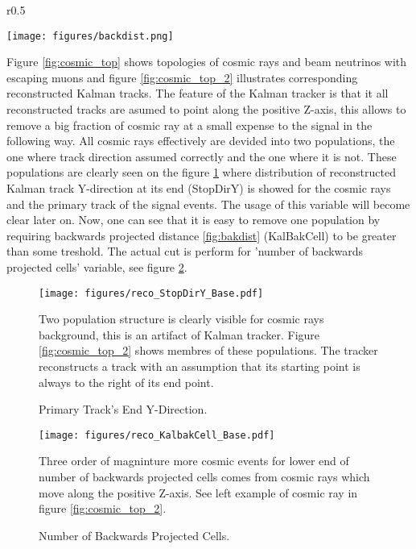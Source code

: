 \begin{wrapfigure}{r}{0.5\textwidth}
\vspace{-15pt}
  \begin{center}
    \texttt{[image: figures/backdist.png]}
  \end{center}
\vspace{0.5mm}
\caption{Backwards projected distance}
\label{fig:bakdist}
\end{wrapfigure}
Figure \ref{fig:cosmic_top} shows topologies of cosmic rays and beam neutrinos with escaping muons and figure
\ref{fig:cosmic_top_2} illustrates corresponding reconstructed Kalman tracks. The feature of the Kalman 
tracker is that it all reconstructed tracks are asumed to point along the positive Z-axis, this allows 
to remove a big fraction of cosmic ray at a small expense to the signal in the following way. All cosmic 
rays effectively are devided into two populations, the one where track direction assumed correctly and the 
one where it is not. These populations are clearly seen on the figure \ref{fig:stopdiry_1} where distribution
of reconstructed Kalman track Y-direction at its end (StopDirY) is showed for the cosmic rays and the primary 
track of the signal events. The usage of this variable will become clear later on. Now, one can see that it 
is easy to remove one population by requiring backwards projected distance \ref{fig:bakdist} (KalBakCell) to 
be greater than some treshold. The actual cut is perform for 'number of backwards projected cells' variable, 
see figure \ref{fig:kalbakcell}.
\begin{figure}[h]
\centering
\texttt{[image: figures/reco\_StopDirY\_Base.pdf]}
\caption{Primary Track's End Y-Direction.}
{Two population structure is clearly visible for cosmic rays background, this is an artifact of Kalman tracker.
Figure \ref{fig:cosmic_top_2} shows membres of these populations. The tracker reconstructs a track with an assumption 
that its starting point is always to the right of its end point. }
\label{fig:stopdiry_1}
\end{figure}
\begin{figure}[h]
\centering
\texttt{[image: figures/reco\_KalbakCell\_Base.pdf]}
\caption{Number of Backwards Projected Cells.}
{Three order of magninture more cosmic events for lower end of number of backwards projected cells comes from cosmic 
rays which move along the positive Z-axis. See left example of cosmic ray in figure \ref{fig:cosmic_top_2}. }
\label{fig:kalbakcell}
\end{figure}

